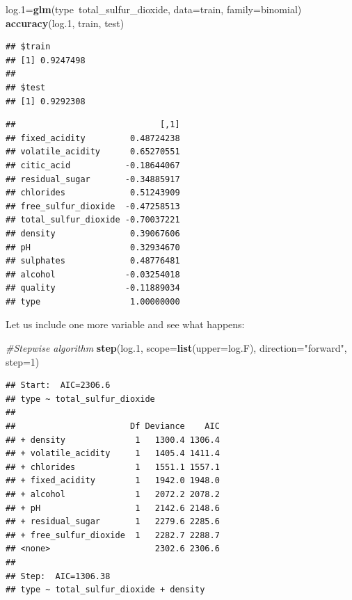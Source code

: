 \documentclass[12pt,]{article}
\newenvironment{Shaded}{\begin{snugshade}}{\end{snugshade}}
\newcommand{\KeywordTok}[1]{\textcolor[rgb]{0.13,0.29,0.53}{\textbf{{#1}}}}
\newcommand{\DataTypeTok}[1]{\textcolor[rgb]{0.13,0.29,0.53}{{#1}}}
\newcommand{\DecValTok}[1]{\textcolor[rgb]{0.00,0.00,0.81}{{#1}}}
\newcommand{\FloatTok}[1]{\textcolor[rgb]{0.00,0.00,0.81}{{#1}}}
\newcommand{\StringTok}[1]{\textcolor[rgb]{0.31,0.60,0.02}{{#1}}}
\newcommand{\CommentTok}[1]{\textcolor[rgb]{0.56,0.35,0.01}{\textit{{#1}}}}
\newcommand{\NormalTok}[1]{{#1}}
\begin{document}
\begin{Shaded}
\begin{Highlighting}[]
\NormalTok{log}\FloatTok{.1}\NormalTok{=}\KeywordTok{glm}\NormalTok{(type~total_sulfur_dioxide, }\DataTypeTok{data=}\NormalTok{train, }\DataTypeTok{family=}\NormalTok{binomial)}
\KeywordTok{accuracy}\NormalTok{(log}\FloatTok{.1}\NormalTok{, train, test)}
\end{Highlighting}
\end{Shaded}

\begin{verbatim}
## $train
## [1] 0.9247498
## 
## $test
## [1] 0.9292308
\end{verbatim}

\begin{Shaded}
\end{Shaded}

\begin{verbatim}
##                             [,1]
## fixed_acidity         0.48724238
## volatile_acidity      0.65270551
## citic_acid           -0.18644067
## residual_sugar       -0.34885917
## chlorides             0.51243909
## free_sulfur_dioxide  -0.47258513
## total_sulfur_dioxide -0.70037221
## density               0.39067606
## pH                    0.32934670
## sulphates             0.48776481
## alcohol              -0.03254018
## quality              -0.11889034
## type                  1.00000000
\end{verbatim}

Let us include one more variable and see what happens:

\begin{Shaded}
\begin{Highlighting}[]
\CommentTok{#Stepwise algorithm}
\KeywordTok{step}\NormalTok{(log}\FloatTok{.1}\NormalTok{, }\DataTypeTok{scope=}\KeywordTok{list}\NormalTok{(}\DataTypeTok{upper=}\NormalTok{log.F), }\DataTypeTok{direction=}\StringTok{"forward"}\NormalTok{, }\DataTypeTok{step=}\DecValTok{1}\NormalTok{)}
\end{Highlighting}
\end{Shaded}

\begin{verbatim}
## Start:  AIC=2306.6
## type ~ total_sulfur_dioxide
## 
##                       Df Deviance    AIC
## + density              1   1300.4 1306.4
## + volatile_acidity     1   1405.4 1411.4
## + chlorides            1   1551.1 1557.1
## + fixed_acidity        1   1942.0 1948.0
## + alcohol              1   2072.2 2078.2
## + pH                   1   2142.6 2148.6
## + residual_sugar       1   2279.6 2285.6
## + free_sulfur_dioxide  1   2282.7 2288.7
## <none>                     2302.6 2306.6
## 
## Step:  AIC=1306.38
## type ~ total_sulfur_dioxide + density
\end{verbatim}
\end{document}
